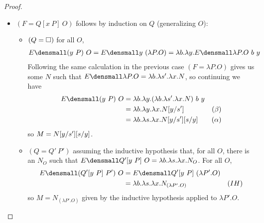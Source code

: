 \begin{proof}
\begin{enumerate}[(a)]
\begin{itemize}
    \item $(F= Q[x ~P] ~O)$
      follows by induction on $Q$ (generalizing $O$):
      \begin{itemize}
      \item $(Q = \hole)$ for all $O$,
        \begin{align*}
          E\den{(y ~ P) ~ O}
          =
          E\den{y ~ (\lambda P. O)}
          &=
          \lambda b. \lambda y. E\den{\lambda P. O} ~ b ~ y
        \end{align*}
        Following the same calculation in the previous case $(F = \lambda P. O)$ gives us
        some $N$ such that $E\den{\lambda P. O} = \lambda b. \lambda s'. \lambda x. N$, so continuing we have
        \begin{align*}
          E\den{(y ~ P) ~ O}
          &=
          \lambda b. \lambda y. (\lambda b. \lambda s'. \lambda x. N) ~ b ~ y
          \\
          &=
          \lambda b. \lambda y. \lambda x. N\subst{s'}{y}
          &(\beta)
          \\
          &=
          \lambda b. \lambda s. \lambda x. N\subst{s'}{y}\subst{y}{s}
          &(\alpha)
        \end{align*}
        so $M = N\subst{s'}{y}\subst{y}{s}$.
      \item $(Q = Q' ~ P')$
        assuming the inductive hypothesis that,
        for all $O$, there is an $N_O$ such that
        $E\den{Q'[y ~ P] ~ O} = \lambda b. \lambda s. \lambda x. N_O$.
        For all $O$,
        \begin{align*}
          E\den{(Q'[y ~ P] ~ P') ~ O}
          &=
          E\den{Q'[y ~ P] ~ (\lambda P'. O)}
          \\
          &=
          \lambda b. \lambda s. \lambda x. N_{(\lambda P'. O)}
          &(IH)
        \end{align*}
        so $M = N_{(\lambda P'. O)}$ given by the inductive hypothesis applied to $\lambda P'. O$.
      \end{itemize}

\end{itemize}
\end{enumerate}
\end{proof}
